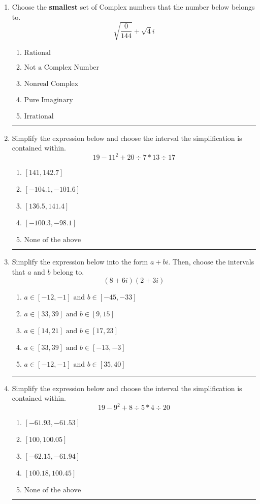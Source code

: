 \documentclass[14pt]{extbook}
\newcommand{\litem}[1]{\item#1\hspace*{-1cm}\rule{\textwidth}{0.4pt}}
\begin{document}
\begin{enumerate}
{\begin{enumerate}[label=\Alph*.]
\end{enumerate} }
\litem{
Choose the \textbf{smallest} set of Complex numbers that the number below belongs to.\[ \sqrt{\frac{0}{144}}+\sqrt{4}i \]\begin{enumerate}[label=\Alph*.]
\item \( \text{Rational} \)
\item \( \text{Not a Complex Number} \)
\item \( \text{Nonreal Complex} \)
\item \( \text{Pure Imaginary} \)
\item \( \text{Irrational} \)

\end{enumerate} }
\litem{
Simplify the expression below and choose the interval the simplification is contained within.\[ 19 - 11^2 + 20 \div 7 * 13 \div 17 \]\begin{enumerate}[label=\Alph*.]
\item \( [141, 142.7] \)
\item \( [-104.1, -101.6] \)
\item \( [136.5, 141.4] \)
\item \( [-100.3, -98.1] \)
\item \( \text{None of the above} \)

\end{enumerate} }
\litem{
Simplify the expression below into the form $a+bi$. Then, choose the intervals that $a$ and $b$ belong to.\[ (8 + 6 i)(2 + 3 i) \]\begin{enumerate}[label=\Alph*.]
\item \( a \in [-12, -1] \text{ and } b \in [-45, -33] \)
\item \( a \in [33, 39] \text{ and } b \in [9, 15] \)
\item \( a \in [14, 21] \text{ and } b \in [17, 23] \)
\item \( a \in [33, 39] \text{ and } b \in [-13, -3] \)
\item \( a \in [-12, -1] \text{ and } b \in [35, 40] \)

\end{enumerate} }
\litem{
Simplify the expression below and choose the interval the simplification is contained within.\[ 19 - 9^2 + 8 \div 5 * 4 \div 20 \]\begin{enumerate}[label=\Alph*.]
\item \( [-61.93, -61.53] \)
\item \( [100, 100.05] \)
\item \( [-62.15, -61.94] \)
\item \( [100.18, 100.45] \)
\item \( \text{None of the above} \)


\end{enumerate}}
\end{enumerate}
\end{document}
